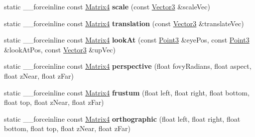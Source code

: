 \begin{DoxyCompactItemize}
\item 
\hypertarget{classVectormath_1_1Aos_1_1Matrix4_a14729610b1554409a7e1eba847bde0ac}{static \-\_\-\-\_\-forceinline const \hyperlink{classVectormath_1_1Aos_1_1Matrix4}{Matrix4} {\bfseries scale} (const \hyperlink{classVectormath_1_1Aos_1_1Vector3}{Vector3} \&scale\-Vec)}\label{classVectormath_1_1Aos_1_1Matrix4_a14729610b1554409a7e1eba847bde0ac}

\item 
\hypertarget{classVectormath_1_1Aos_1_1Matrix4_a8875d9197f01c7748c533f83f0f0e06b}{static \-\_\-\-\_\-forceinline const \hyperlink{classVectormath_1_1Aos_1_1Matrix4}{Matrix4} {\bfseries translation} (const \hyperlink{classVectormath_1_1Aos_1_1Vector3}{Vector3} \&translate\-Vec)}\label{classVectormath_1_1Aos_1_1Matrix4_a8875d9197f01c7748c533f83f0f0e06b}

\item 
\hypertarget{classVectormath_1_1Aos_1_1Matrix4_a8ec49c7b5e1ca6d8a2f7d23e278c712c}{static \-\_\-\-\_\-forceinline const \hyperlink{classVectormath_1_1Aos_1_1Matrix4}{Matrix4} {\bfseries look\-At} (const \hyperlink{classVectormath_1_1Aos_1_1Point3}{Point3} \&eye\-Pos, const \hyperlink{classVectormath_1_1Aos_1_1Point3}{Point3} \&look\-At\-Pos, const \hyperlink{classVectormath_1_1Aos_1_1Vector3}{Vector3} \&up\-Vec)}\label{classVectormath_1_1Aos_1_1Matrix4_a8ec49c7b5e1ca6d8a2f7d23e278c712c}

\item 
\hypertarget{classVectormath_1_1Aos_1_1Matrix4_aa27663057be5c6d4f43f85e87fbf0a3b}{static \-\_\-\-\_\-forceinline const \hyperlink{classVectormath_1_1Aos_1_1Matrix4}{Matrix4} {\bfseries perspective} (float fovy\-Radians, float aspect, float z\-Near, float z\-Far)}\label{classVectormath_1_1Aos_1_1Matrix4_aa27663057be5c6d4f43f85e87fbf0a3b}

\item 
\hypertarget{classVectormath_1_1Aos_1_1Matrix4_ac7db57cffc1f7bb81b062c118e0f9bc2}{static \-\_\-\-\_\-forceinline const \hyperlink{classVectormath_1_1Aos_1_1Matrix4}{Matrix4} {\bfseries frustum} (float left, float right, float bottom, float top, float z\-Near, float z\-Far)}\label{classVectormath_1_1Aos_1_1Matrix4_ac7db57cffc1f7bb81b062c118e0f9bc2}

\item 
\hypertarget{classVectormath_1_1Aos_1_1Matrix4_a9a8ca6bba76eb5bacaf748c85f379d8c}{static \-\_\-\-\_\-forceinline const \hyperlink{classVectormath_1_1Aos_1_1Matrix4}{Matrix4} {\bfseries orthographic} (float left, float right, float bottom, float top, float z\-Near, float z\-Far)}\label{classVectormath_1_1Aos_1_1Matrix4_a9a8ca6bba76eb5bacaf748c85f379d8c}

\end{DoxyCompactItemize}


